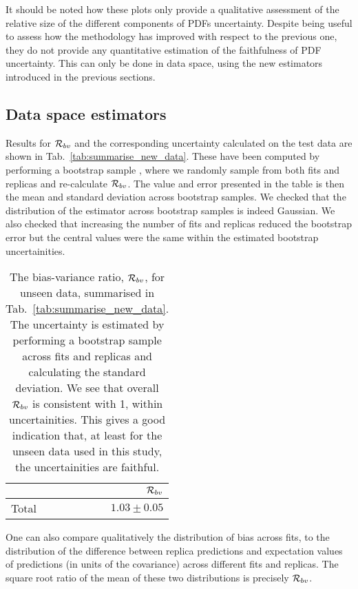 It should be noted how these plots only provide a qualitative assessment of the relative size of the different
components of PDFs uncertainty. Despite being useful to assess how the methodology has improved with respect
to the previous one, they do not provide any quantitative estimation of the faithfulness of PDF uncertainty.
This can only be done in data space, using the new estimators introduced in the previous sections.


\subsection{Data space estimators}

Results for $\mathcal{R}_{bv}$ and the corresponding uncertainty calculated on the test data are shown in
Tab.~\ref{tab:summarise_new_data}. These have been computed by performing a bootstrap sample
\cite{efron1994introduction}, where we randomly sample from both fits and replicas and re-calculate
$\mathcal{R}_{bv}$. The value and error presented in the table is then the mean
and standard deviation across bootstrap samples. We checked that the distribution
of the estimator across bootstrap samples is indeed Gaussian. We also checked
that increasing the number of fits and replicas reduced the bootstrap error but
the central values were the same within the estimated bootstrap uncertainities.

\begin{table}[hb]
    \begin{center}
        \begin{tabular}{lr}
            \toprule
            {}     &  $\mathcal{R}_{bv}$ \\
            \midrule
            Total  &  $1.03\pm0.05$   \\
            \bottomrule
            \end{tabular}
    \end{center}
    \caption{
        The bias-variance ratio, $\mathcal{R}_{bv}$, for unseen data, summarised in
        Tab.~\ref{tab:summarise_new_data}. The uncertainty is estimated by
        performing a bootstrap sample across fits and replicas and calculating
        the standard deviation. We see that overall $\mathcal{R}_{bv}$ is consistent
        with 1, within uncertainities. This gives a good indication that, at least
        for the unseen data used in this study, the uncertainities are faithful.
    }
    \label{tab:biasvarratio}
\end{table}

One can also compare qualitatively the distribution of bias across fits, to the
distribution of the difference between replica predictions and expectation
values of predictions (in units of the covariance) across different fits
and replicas. The square root ratio of the mean of these two distributions
is precisely $\mathcal{R}_{bv}$.

